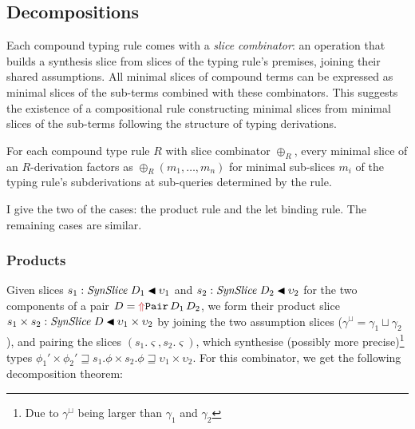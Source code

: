 \subsection{\yo Decompositions}
\label{sec:decompositions}

Each compound typing rule comes with a \textit{slice combinator}: an operation that builds a synthesis slice from slices of the typing rule's premises, joining their shared assumptions. All minimal slices of compound terms can be expressed as minimal slices of the sub-terms combined with these combinators. This suggests the existence of a compositional rule constructing minimal slices from minimal slices of the sub-terms following the structure of typing derivations.

\begin{majortheorembox}
%
\begin{theorem}[\yo Decompositions]\label{thm:decomp-master}
For each compound type rule $R$ with slice combinator $\oplus_R$, every minimal slice of an $R$-derivation factors as $\oplus_R(m_1,\ldots,m_n)$ for minimal sub-slices $m_i$ of the typing rule's subderivations at sub-queries determined by the rule.
\end{theorem}
\end{majortheorembox}
\mastercases

I give the two of the cases: the product rule and the let binding rule. The remaining cases are similar.

\subsubsection{\yo Products}
\label{sec:case-pair}

Given slices $s_1 : \mathit{SynSlice}\;D_1 \mathbin{\blacktriangleleft} \upsilon_1$ and $s_2 : \mathit{SynSlice}\;D_2 \mathbin{\blacktriangleleft} \upsilon_2$ for the two components of a pair $D = \synr{Pair}\,D_1\,D_2$, we form their product slice $s_1 \times s_2 : \mathit{SynSlice}\;D \mathbin{\blacktriangleleft} \upsilon_1 \times \upsilon_2$ by joining the two assumption slices ($\gamma^{\sqcup} = \gamma_1 \sqcup \gamma_2$), and pairing the slices $(s_1.\varsigma, s_2.\varsigma)$, which synthesise (possibly more precise)\footnote{Due to $\gamma^{\sqcup}$ being larger than $\gamma_1$ and $\gamma_2$} types $\phi_1' \times \phi_2' \sqsupseteq s_1.\phi \times s_2.\phi \sqsupseteq \upsilon_1 \times \upsilon_2$. For this combinator, we get the following decomposition theorem:

